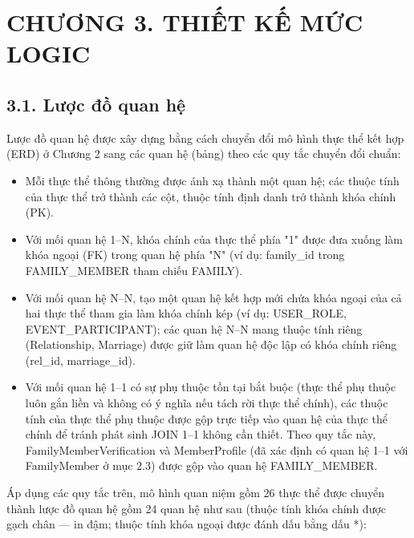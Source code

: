\section{CHƯƠNG 3. THIẾT KẾ MỨC LOGIC}
\label{sec:chuong3}

\subsection{3.1. Lược đồ quan hệ}
\label{sec:luoc_do_quan_he}

Lược đồ quan hệ được xây dựng bằng cách chuyển đổi mô hình thực thể kết hợp (ERD) ở Chương 2 sang các quan hệ (bảng) theo các quy tắc chuyển đổi chuẩn:

\begin{itemize}
	\item Mỗi thực thể thông thường được ánh xạ thành một quan hệ; các thuộc tính của thực thể trở thành các cột, thuộc tính định danh trở thành khóa chính (PK).
	\item Với mối quan hệ 1--N, khóa chính của thực thể phía "1" được đưa xuống làm khóa ngoại (FK) trong quan hệ phía "N" (ví dụ: family\_id trong FAMILY\_MEMBER tham chiếu FAMILY).
	\item Với mối quan hệ N--N, tạo một quan hệ kết hợp mới chứa khóa ngoại của cả hai thực thể tham gia làm khóa chính kép (ví dụ: USER\_ROLE, EVENT\_PARTICIPANT); các quan hệ N--N mang thuộc tính riêng (Relationship, Marriage) được giữ làm quan hệ độc lập có khóa chính riêng (rel\_id, marriage\_id).
	\item Với mối quan hệ 1--1 có sự phụ thuộc tồn tại bắt buộc (thực thể phụ thuộc luôn gắn liền và không có ý nghĩa nếu tách rời thực thể chính), các thuộc tính của thực thể phụ thuộc được gộp trực tiếp vào quan hệ của thực thể chính để tránh phát sinh JOIN 1--1 không cần thiết. Theo quy tắc này, FamilyMemberVerification và MemberProfile (đã xác định có quan hệ 1--1 với FamilyMember ở mục 2.3) được gộp vào quan hệ FAMILY\_MEMBER.
\end{itemize}

Áp dụng các quy tắc trên, mô hình quan niệm gồm 26 thực thể được chuyển thành lược đồ quan hệ gồm 24 quan hệ như sau (thuộc tính khóa chính được gạch chân --- in đậm; thuộc tính khóa ngoại được đánh dấu bằng dấu *):

\renewcommand{\arraystretch}{1.3}
\setlength{\tabcolsep}{3pt}

